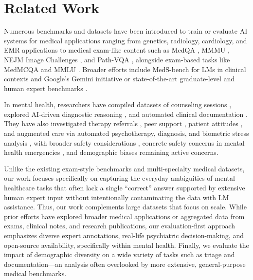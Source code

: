 
\section{Related Work}
\label{sec:2_related_work}

Numerous benchmarks and datasets have been introduced to train or evaluate AI systems for medical applications
ranging from genetics, radiology, cardiology, and EMR applications \cite{Hou2023, Zambrano2023, Oh2024} to medical exam-like content such as MedQA \cite{Jin2021}, MMMU \cite{Yue2023}, NEJM Image Challenges \cite{NEJM2024}, and Path-VQA \cite{He2020}, alongside exam-based tasks like MedMCQA \citep{pmlr-v174-pal22a} and MMLU \citep{hendrycks2021measuring}. 
Broader efforts include MedS-bench \citep{Wu2025} for LMs in clinical contexts and Google’s Gemini initiative \cite{Saab2024} or state-of-the-art graduate-level and human expert benchmarks \citep{rein2024gpqa, phan2025humanitysexam}. 

In mental health, researchers have compiled datasets of counseling sessions \citep{Adhikary2024}, explored AI-driven diagnostic reasoning \citep{karthikesalingam2024_14}, and automated clinical documentation \citep{falcetta2023_15, axios2024_16}. 
They have also investigated therapy referrals \citep{sin2024_36, habicht2024_37}, peer support \citep{sharma2023_38}, patient attitudes \citep{pataranutaporn2023_39}, and augmented care via automated psychotherapy, diagnosis, and biometric stress analysis \citep{higgins2023_17, thieme2023_18, li2023_41, balan2024_42, kasula2023_19, ates2024_40}, with broader safety considerations \citep{ganguli2022red, wang2023decodingtrust, zhang2023safetybench, liu2024mmsafetybench}, concrete safety concerns in mental health emergencies \citep{grabb2024risks}, and demographic biases \citep{gabriel_can_2024} remaining active concerns.

Unlike the existing exam-style benchmarks and multi-specialty medical datasets, our work focuses specifically on capturing the everyday ambiguities of mental healthcare tasks that often lack a single “correct” answer supported by extensive human expert input without intentionally contaminating the data with LM assistance. 
Thus, our work complements large datasets \citep[e.g.][]{Wu2025} that focus on scale.
While prior efforts have explored broader medical applications or aggregated data from exams, clinical notes, and research publications, our evaluation-first approach emphasizes diverse expert annotations, real-life psychiatric decision-making, and open-source availability, specifically within mental health. 
Finally, we evaluate the impact of demographic diversity on a wide variety of tasks such as triage and documentation—an analysis often overlooked by more extensive, general-purpose medical benchmarks.

